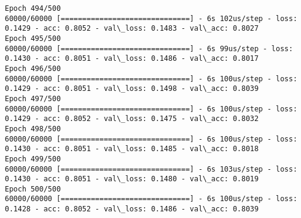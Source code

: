 \documentclass[11pt]{article}
\begin{document}
\begin{Verbatim}[commandchars=\\\{\}]
Epoch 494/500
60000/60000 [==============================] - 6s 102us/step - loss: 0.1429 - acc: 0.8052 - val\_loss: 0.1483 - val\_acc: 0.8027
Epoch 495/500
60000/60000 [==============================] - 6s 99us/step - loss: 0.1430 - acc: 0.8051 - val\_loss: 0.1486 - val\_acc: 0.8017
Epoch 496/500
60000/60000 [==============================] - 6s 100us/step - loss: 0.1429 - acc: 0.8051 - val\_loss: 0.1498 - val\_acc: 0.8039
Epoch 497/500
60000/60000 [==============================] - 6s 100us/step - loss: 0.1429 - acc: 0.8052 - val\_loss: 0.1475 - val\_acc: 0.8032
Epoch 498/500
60000/60000 [==============================] - 6s 100us/step - loss: 0.1430 - acc: 0.8051 - val\_loss: 0.1485 - val\_acc: 0.8018
Epoch 499/500
60000/60000 [==============================] - 6s 103us/step - loss: 0.1430 - acc: 0.8051 - val\_loss: 0.1480 - val\_acc: 0.8019
Epoch 500/500
60000/60000 [==============================] - 6s 100us/step - loss: 0.1428 - acc: 0.8052 - val\_loss: 0.1486 - val\_acc: 0.8039

    \end{Verbatim}
\end{document}

